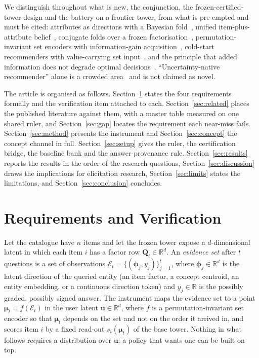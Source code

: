 \documentclass[manuscript,screen]{acmart}
\newcommand{\R}{\mathbb{R}}
\newcommand{\Q}{\mathbf{Q}}
\newcommand{\uu}{\mathbf{u}}
\newcommand{\bphi}{\boldsymbol{\phi}}
\newcommand{\bmu}{\boldsymbol{\mu}}
\begin{document}
We distinguish throughout what is new, the conjunction, the frozen-certified-tower design and the battery on a frontier tower, from what is pre-empted and must be cited: attributes as directions with a Bayesian fold~\citep{biyik2023soft}, unified item-plus-attribute belief~\citep{li2021seamlessly}, conjugate folds over a frozen factorisation~\citep{toroghi2023bcie}, permutation-invariant set encoders with information-gain acquisition~\citep{ma2019eddi}, cold-start recommenders with value-carrying set input~\citep{lin2021tanp}, and the principle that added information does not degrade optimal decisions~\citep{good1967principle,blackwell1953equivalent}. ``Uncertainty-native recommender'' alone is a crowded area~\citep{wang2025bdecf} and is not claimed as novel.

The article is organised as follows. Section~\ref{sec:reqs} states the four requirements formally and the verification item attached to each. Section~\ref{sec:related} places the published literature against them, with a master table measured on one shared ruler, and Section~\ref{sec:gap} locates the requirement each near-miss fails. Section~\ref{sec:method} presents the instrument and Section~\ref{sec:concept} the concept channel in full. Section~\ref{sec:setup} gives the ruler, the certification bridge, the baseline bank and the answer-provenance rule. Section~\ref{sec:results} reports the results in the order of the research questions, Section~\ref{sec:discussion} draws the implications for elicitation research, Section~\ref{sec:limits} states the limitations, and Section~\ref{sec:conclusion} concludes.

\section{Requirements and Verification}\label{sec:reqs}

Let the catalogue have $n$ items and let the frozen tower expose a $d$-dimensional latent in which each item $i$ has a factor row $\Q_i\in\R^{d}$. An \emph{evidence set} after $t$ questions is a set of observations $\mathcal E_t=\{(\bphi_j, y_j)\}_{j=1}^{t}$, where $\bphi_j\in\R^{d}$ is the latent direction of the queried entity (an item factor, a concept centroid, an entity embedding, or a continuous direction token) and $y_j\in\R$ is the possibly graded, possibly signed answer. The instrument maps the evidence set to a point $\bmu_t = f(\mathcal E_t)$ in the user latent $\uu\in\R^{d}$, where $f$ is a permutation-invariant set encoder so that $\bmu_t$ depends on the set and not on the order it arrived in, and scores item $i$ by a fixed read-out $s_i(\bmu_t)$ of the base tower. Nothing in what follows requires a distribution over $\uu$; a policy that wants one can be built on top.
\end{document}
